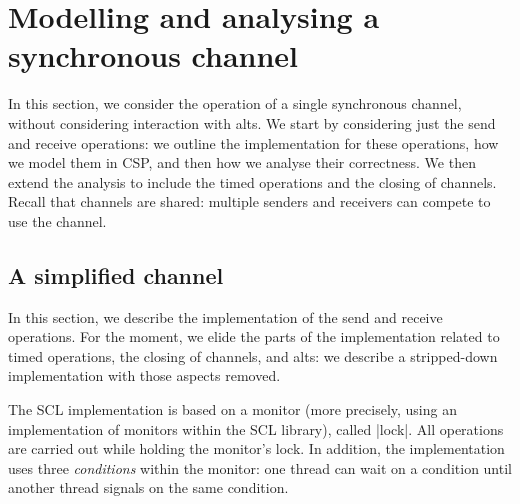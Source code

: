\section{Modelling and analysing a  synchronous channel}
\label{sec:syncchan}

\inlineScala

In this section, we consider the operation of a single synchronous channel,
without considering interaction with alts.
%
We start by considering just the send and receive operations: we outline the
implementation for these operations, how we model them in CSP, and then how we
analyse their correctness.  We then extend the analysis to include the timed
operations and the closing of channels.  Recall that channels are shared:
multiple senders and receivers can compete to use the channel.



\subsection{A simplified channel}

In this section, we describe the implementation of the send and receive
operations.  For the moment, we elide the parts of the implementation related
to timed operations, the closing of channels, and alts: we describe a
stripped-down implementation with those aspects removed.


The SCL implementation is based on a monitor (more precisely, using an
implementation of monitors within the SCL library), called |lock|.  All
operations are carried out while holding the monitor's lock.  In addition, the
implementation uses three \emph{conditions} within the monitor: one thread can
wait on a condition until another thread signals on the same condition.

